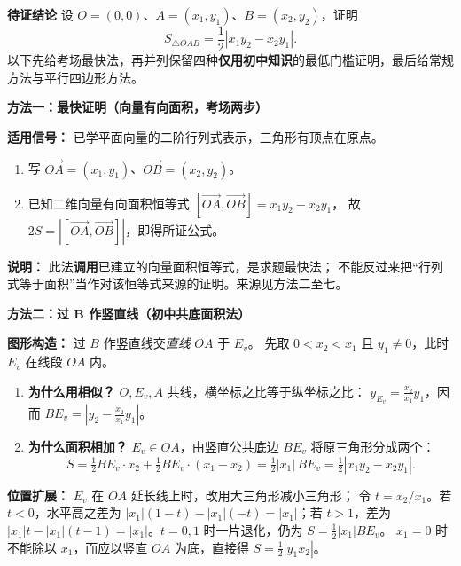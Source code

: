 \begin{proofbox}
\textbf{\textcolor{CProof}{待证结论}}
设 $O=(0,0)$、$A=(x_1,y_1)$、$B=(x_2,y_2)$，证明
\[\boxed{S_{\triangle OAB}=\frac12|x_1y_2-x_2y_1|.}\]
以下先给考场最快法，再并列保留四种\textbf{仅用初中知识}的最低门槛证明，最后给常规方法与平行四边形方法。

\medskip
\textbf{\textcolor{CProof}{方法一：最快证明（向量有向面积，考场两步）}}

\textbf{适用信号：} 已学平面向量的二阶行列式表示，三角形有顶点在原点。
\begin{enumerate}[leftmargin=*,itemsep=0.25em]
\item 写 $\vec{OA}=(x_1,y_1)$、$\vec{OB}=(x_2,y_2)$。
\item 已知二维向量有向面积恒等式 $[\vec{OA},\vec{OB}]=x_1y_2-x_2y_1$，
故 $2S=|[\vec{OA},\vec{OB}]|$，即得所证公式。
\end{enumerate}
\textbf{说明：} 此法\textbf{调用}已建立的向量面积恒等式，是求题最快法；
不能反过来把“行列式等于面积”当作对该恒等式来源的证明。来源见方法二至七。

\medskip
\end{proofbox}
\clearpage
\begin{proofbox}
\textbf{\textcolor{CProof}{方法二：过 B 作竖直线（初中共底面积法）}}

\textbf{图形构造：} 过 $B$ 作竖直线交\emph{直线} $OA$ 于 $E_v$。
先取 $0<x_2<x_1$ 且 $y_1\ne0$，此时 $E_v$ 在线段 $OA$ 内。
\begin{enumerate}[leftmargin=*,itemsep=0.25em]
\item \textbf{为什么用相似？} $O,E_v,A$ 共线，横坐标之比等于纵坐标之比：
$y_{E_v}=\frac{x_2}{x_1}y_1$，因而 $BE_v=|y_2-\frac{x_2}{x_1}y_1|$。
\item \textbf{为什么面积相加？} $E_v\in OA$，由竖直公共底边 $BE_v$ 将原三角形分成两个：
\[
 S=\tfrac12 BE_v\cdot x_2+\tfrac12 BE_v\cdot(x_1-x_2)
 =\tfrac12 |x_1|\,BE_v
 =\tfrac12|x_1y_2-x_2y_1|.
\]
\end{enumerate}
\textbf{位置扩展：} $E_v$ 在 $OA$ 延长线上时，改用大三角形减小三角形；
令 $t=x_2/x_1$。若 $t<0$，水平高之差为 $|x_1|(1-t)-|x_1|(-t)=|x_1|$；若 $t>1$，差为 $|x_1|t-|x_1|(t-1)=|x_1|$。$t=0,1$ 时一片退化，仍为 $S=\frac12|x_1|BE_v$。
$ x_1=0$ 时不能除以 $x_1$，而应以竖直 $OA$ 为底，直接得 $S=\tfrac12|y_1x_2|$。

\medskip
\end{proofbox}
\clearpage
